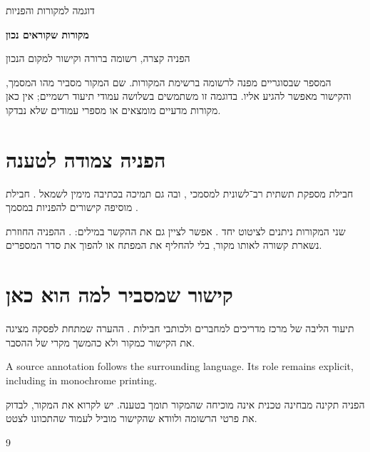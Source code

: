 \def\lakitdocumentclass{article}
\def\lakitclassoptions{11pt,a4paper}
\def\lakitgeometryoptions{margin=2.1cm,headheight=14pt}
\def\lakitlinespread{1.16}




{\small\sffamily\noindent דוגמה למקורות והפניות\par}\medskip
{\LARGE\sffamily\bfseries\noindent מקורות שקוראים נכון\par}\smallskip
{\large\noindent הפניה קצרה, רשומה ברורה וקישור למקום הנכון\par}\bigskip
המספר שבסוגריים מפנה לרשומה ברשימת המקורות. שם המקור מסביר מהו המסמך,
והקישור מאפשר להגיע אליו. בדוגמה זו משתמשים בשלושה עמודי תיעוד רשמיים;
אין כאן מקורות מדעיים מומצאים או מספרי עמודים שלא נבדקו.
\section{הפניה צמודה לטענה}
חבילת  מספקת תשתית רב־לשונית למסמכי , ובה גם תמיכה
בכתיבה מימין לשמאל \cite{babel}. חבילת  מוסיפה קישורים
להפניות במסמך \cite{hyperref}.

שני המקורות ניתנים לציטוט יחד \cite{babel,hyperref}. אפשר לציין גם את
ההקשר במילים: \cite[\h{תיאור החבילה}]{babel}. ההפניה החוזרת נשארת קשורה
לאותו מקור, בלי להחליף את המפתח או להפוך את סדר המספרים.
\section{קישור שמסביר למה הוא כאן}
תיעוד הליבה של  מרכז מדריכים למחברים ולכותבי חבילות \cite{latex}.
ההערה שמתחת לפסקה מציגה את הקישור כמקור ולא כהמשך מקרי של ההסבר.
\begin{englishprose}
A source annotation follows the surrounding language. Its role remains explicit,
including in monochrome printing.
\end{englishprose}
\begin{notebox}[frametitle={מה עדיין צריך לבדוק}]
הפניה תקינה מבחינה טכנית אינה מוכיחה שהמקור תומך בטענה. יש לקרוא את המקור,
לבדוק את פרטי הרשומה ולוודא שהקישור מוביל לעמוד שהתכוונו לצטט.
\end{notebox}
\begin{thebibliography}{9}
\end{thebibliography}

